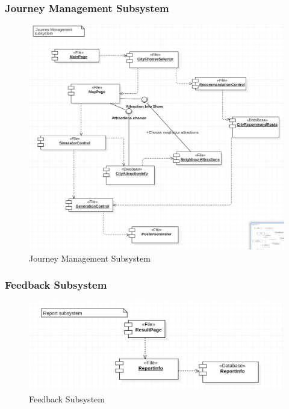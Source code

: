 \documentclass[10pt]{article}
\begin{document}
\subsubsection{Journey Management Subsystem}
\begin{figure}[H]
    \centering
    
    \includegraphics[width=14cm]{journeybefore.png}
    \caption{Journey Management Subsystem}
    \label{Journey Management Subsystem}
\end{figure}

\subsubsection{Feedback Subsystem}
\begin{figure}[H]
    \centering
    
    \includegraphics[width=14cm]{reportbefore.png}
    \caption{Feedback Subsystem}
    \label{Feedback Subsystem}
\end{figure}
\end{document}
